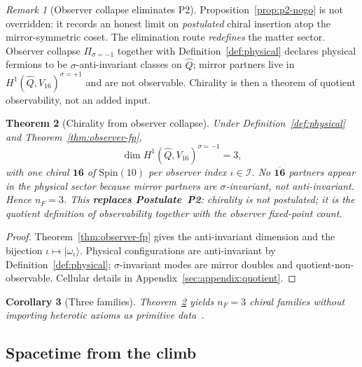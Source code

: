 \documentclass[11pt]{article}
\theoremstyle{plain}
\newtheorem{theorem}{Theorem}[section]
\newtheorem{corollary}[theorem]{Corollary}
\theoremstyle{definition}
\theoremstyle{remark}
\newtheorem{remark}[theorem]{Remark}
\numberwithin{equation}{section}
\newcommand{\Spin}{\mathrm{Spin}}
\begin{document}
\begin{remark}[Observer collapse eliminates P2]
Proposition~\ref{prop:p2-nogo} is not overridden: it records an honest limit
on \emph{postulated} chiral insertion atop the mirror-symmetric coset. The
elimination route \emph{redefines} the matter sector. Observer collapse
$\Pi_{\sigma=-1}$ together with Definition~\ref{def:physical} declares
physical fermions to be $\sigma$-anti-invariant classes on $\hat Q$; mirror
partners live in $H^1(\hat Q,V_{16})^{\sigma=+1}$ and are not observable.
Chirality is then a theorem of quotient observability, not an added input.
\end{remark}

\begin{theorem}[Chirality from observer collapse]\label{thm:chirality-derived}
Under Definition~\ref{def:physical} and Theorem~\ref{thm:observer-fp},
\begin{equation}\label{eq:chirality-derived}
  \dim H^1(\hat Q,V_{16})^{\sigma=-1}=3,
\end{equation}
with one chiral $\mathbf{16}$ of $\Spin(10)$ per observer index
$\iota\in\mathcal{I}$. No $\overline{\mathbf{16}}$ partners appear in the
physical sector because mirror partners are $\sigma$-invariant, not
anti-invariant. Hence $n_F=3$. This \textbf{replaces Postulate~P2}: chirality
is not postulated; it is the quotient definition of observability together
with the observer fixed-point count.
\end{theorem}

\begin{proof}
Theorem~\ref{thm:observer-fp} gives the anti-invariant dimension and the
bijection $\iota\mapsto|\omega_\iota\rangle$. Physical configurations are
anti-invariant by Definition~\ref{def:physical}; $\sigma$-invariant modes are
mirror doubles and quotient-non-observable. Cellular details in
Appendix~\ref{sec:appendix:quotient}.
\end{proof}

\begin{corollary}[Three families]\label{thm:three-families}
Theorem~\ref{thm:chirality-derived} yields $n_F=3$ chiral families without
importing heterotic axioms as primitive data~\cite{Witten1985}.
\end{corollary}

\subsection{Spacetime from the climb}
\label{sec:physics:spacetime}
\end{document}
